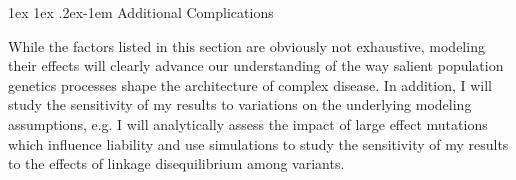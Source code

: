 \message{ !name(ResearchStrategy.tex)}\documentclass[11pt]{article}
\makeatletter
\newcommand{\jb}[1]{{\color{blue} (#1)} }
\renewcommand{\paragraph}{%
  \@startsection{paragraph}{4}%
  {\z@}{1ex \@plus 1ex \@minus .2ex}{-1em}%
  {\normalfont\normalsize\bfseries}%
}
\makeatother
\begin{document}

\paragraph{Additional Complications}

While the factors listed in this section are obviously not exhaustive, modeling their effects will clearly advance our understanding of the way salient population genetics processes shape the architecture of complex disease. In addition, I will study the sensitivity of my results to variations on the underlying modeling assumptions, e.g. I will analytically assess the impact of large effect mutations which influence liability and use simulations to study the sensitivity of my results to the effects of linkage disequilibrium among variants.


\end{document}
